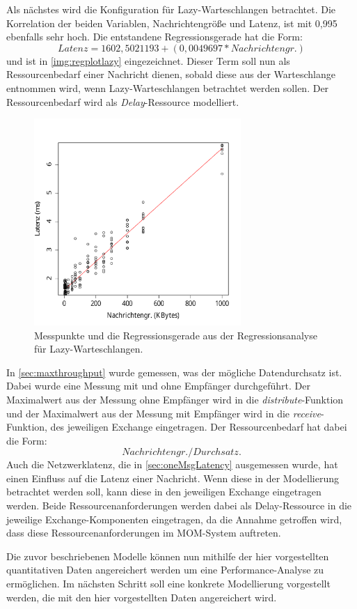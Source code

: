 Als nächstes wird die Konfiguration für Lazy-Warteschlangen betrachtet. Die Korrelation der beiden Variablen, Nachrichtengröße und Latenz, ist mit 0,995 ebenfalls sehr hoch. Die entstandene Regressionsgerade hat die Form: \[Latenz = 1602,5021193 + (0,0049697 * Nachrichtengr.)\] und ist in \autoref{img:regplotlazy} eingezeichnet. Dieser Term soll nun als Ressourcenbedarf einer Nachricht dienen, sobald diese aus der Warteschlange entnommen wird, wenn Lazy-Warteschlangen betrachtet werden sollen. Der Ressourcenbedarf wird als \emph{Delay}-Ressource modelliert.
\begin{figure}
\center
  \includegraphics[width=0.7\textwidth]{images/modelling/oneMsgLazyRegression.pdf}
  \caption{Messpunkte und die Regressionsgerade aus der Regressionsanalyse für Lazy-Warteschlangen.}
  \label{img:regplotlazy}
\end{figure}

In \autoref{sec:maxthroughput} wurde gemessen, was der mögliche Datendurchsatz ist. Dabei wurde eine Messung mit und ohne Empfänger durchgeführt. Der Maximalwert aus der Messung ohne Empfänger wird in die \emph{distribute}-Funktion und der Maximalwert aus der Messung mit Empfänger wird in die \emph{receive}-Funktion, des jeweiligen Exchange eingetragen. Der Ressourcenbedarf hat dabei die Form: \[Nachrichtengr. /  Durchsatz.\]
Auch die Netzwerklatenz, die in \autoref{sec:oneMsgLatency} ausgemessen wurde, hat einen Einfluss auf die Latenz einer Nachricht. Wenn diese in der Modellierung betrachtet werden soll, kann diese in den jeweiligen Exchange eingetragen werden. Beide Ressourcenanforderungen werden dabei als Delay-Ressource in die jeweilige Exchange-Komponenten eingetragen, da die Annahme getroffen wird, dass diese Ressourcenanforderungen im MOM-System auftreten. \par
Die zuvor beschriebenen Modelle können nun mithilfe der hier vorgestellten quantitativen Daten angereichert werden um eine Performance-Analyse zu ermöglichen. Im nächsten Schritt soll eine konkrete Modellierung vorgestellt werden, die mit den hier vorgestellten Daten angereichert wird. 

